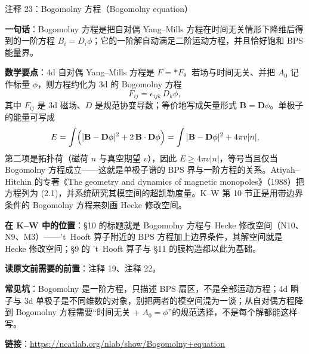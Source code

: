 \begin{kcard}{注释 23：Bogomolny 方程（Bogomolny equation）}

\textbf{一句话}：Bogomolny 方程是把自对偶 Yang--Mills 方程在时间无关情形下降维后得到的一阶方程 $B_i=D_i\phi$；它的一阶解自动满足二阶运动方程，并且恰好饱和 BPS 能量界。

\textbf{数学要点}：4d 自对偶 Yang--Mills 方程是 $F=*F$。若场与时间无关、并把 $A_0$ 记作标量 $\phi$，则方程约化为 3d 的 Bogomolny 方程
\[
F_{ij}=\epsilon_{ijk}\,D_k\phi ,
\]
其中 $F_{ij}$ 是 3d 磁场、$D$ 是规范协变导数；等价地写成矢量形式 $\mathbf B=\mathbf D\phi$。单极子的能量可写成
\[
E=\int\Bigl(|\mathbf B-\mathbf D\phi|^2+2\,\mathbf B\cdot\mathbf D\phi\Bigr)
=\int|\mathbf B-\mathbf D\phi|^2+4\pi v|n| ,
\]
第二项是拓扑荷（磁荷 $n$ 与真空期望 $v$），因此 $E\ge 4\pi v|n|$，等号当且仅当 Bogomolny 方程成立——这就是单极子谱的 BPS 界与一阶方程的关系。Atiyah--Hitchin 的专著《The geometry and dynamics of magnetic monopoles》（1988）把方程列为 (2.1)，并系统研究其模空间的超凯勒度量。K--W 第 10 节正是用带边界条件的 Bogomolny 方程来刻画 Hecke 修改空间。

\textbf{在 K--W 中的位置}：§10 的标题就是 Bogomolny 方程与 Hecke 修改空间（N10、N9、M3）——'t~Hooft 算子附近的 BPS 方程加上边界条件，其解空间就是 Hecke 修改空间；§9 的 't~Hooft 算子与 §11 的膜构造都以此为基础。

\textbf{读原文前需要的前置}：注释 19、注释 22。

\textbf{常见坑}：Bogomolny 是一阶方程，只描述 BPS 扇区，不是全部运动方程；4d 瞬子与 3d 单极子是不同维数的对象，别把两者的模空间混为一谈；从自对偶方程降到 Bogomolny 方程需要“时间无关 + $A_0=\phi$”的规范选择，不是每个解都能这样写。

\noindent\textbf{链接}：\url{https://ncatlab.org/nlab/show/Bogomolny+equation}
\end{kcard}

